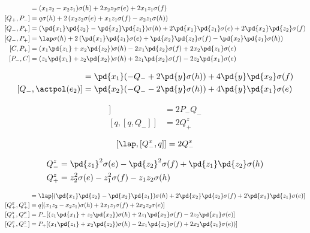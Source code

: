 \begin{appendices}
\begin{align}
[Q_+, P_-] &= (x_1z_2 - x_2z_1)\sigma(h) + 2x_2z_2\sigma(e) + 2x_1z_1\sigma(f)\\
[Q_+, P_-] &= q\sigma(h) + 2\left(x_2z_2\sigma(e) + x_1z_1\sigma(f) -x_2z_1\sigma(h) \right)\\
[Q_-, P_+] &= (\pd{x_1}\pd{z_2} - \pd{x_2}\pd{z_1})\sigma(h) + 2\pd{x_1}\pd{z_1}\sigma(e) + 2\pd{x_2}\pd{z_2}\sigma(f) \\
[Q_-, P_+] &= \lap\sigma(h) + 2\left(\pd{x_1}\pd{z_1}\sigma(e) + \pd{x_2}\pd{z_2}\sigma(f) - \pd{x_2}\pd{z_1} \sigma(h)\right)\\
[C, P_+] &= (x_1\pd{z_1} + x_2 \pd{z_2})\sigma(h) - 2x_1\pd{z_2}\sigma(f) + 2x_2 \pd{z_1} \sigma(e) \\
[P_-, C] &= (z_1\pd{x_1} + z_2 \pd{x_2})\sigma(h) + 2 z_1\pd{x_2}\sigma(f) - 2z_2 \pd{x_1} \sigma(e)
\end{align}

\begin{align}
[Q_-, \actpol(e_1)] & = \pd{x_1}(- Q_- + 2\pd{y}\sigma(h) ) + 4\pd{y}\pd{x_2}\sigma(f) \\
[Q_-, \actpol(e_2)] & = \pd{x_2}( - Q_- -2\pd{y}\sigma(h)) + 4\pd{y}\pd{x_1}\sigma(e)
\end{align}

\begin{align}
 [Q_-, [Q_-, q]] & = 2P_-Q_-\\
 [q, [q, Q_-]] & = 2Q_+^z
\end{align}

\[
 [\lap, [Q_-^x, q]] = 2Q_-^x
\]

\begin{align}
Q_-^z &= \pd{z_1}^2 \sigma(e) - \pd{z_2}^2 \sigma(f) + \pd{z_1}\pd{z_2} \sigma(h) \\
Q_+^z &= z_2^2 \sigma(e) - z_1^2 \sigma(f) - z_1 z_2 \sigma(h)
\end{align}


\begin{align}
[Q_-^x, Q_-^z] & = \lap[(\pd{x_1}\pd{z_2} - \pd{x_2}\pd{z_1}) \sigma(h) + 2\pd{x_2}\pd{z_2}\sigma(f) + 2\pd{x_1}\pd{z_1}\sigma(e)] \\
[Q_+^x, Q_+^z] & = q[(x_1 z_2 - x_2 z_1) \sigma(h) + 2x_1 z_1 \sigma(f) + 2x_2 z_2 \sigma(e)] \\
[Q_+^z, Q_-^x] & = P_-[(z_1\pd{x_1} + z_2 \pd{x_2})\sigma(h) + 2 z_1\pd{x_2}\sigma(f) - 2z_2 \pd{x_1} \sigma(e)] \\
[Q_+^x, Q_-^z] & = P_+[(x_1\pd{z_1} + x_2 \pd{z_2})\sigma(h) - 2x_1\pd{z_2}\sigma(f) + 2x_2 \pd{z_1} \sigma(e))]
\end{align}


\end{appendices}
